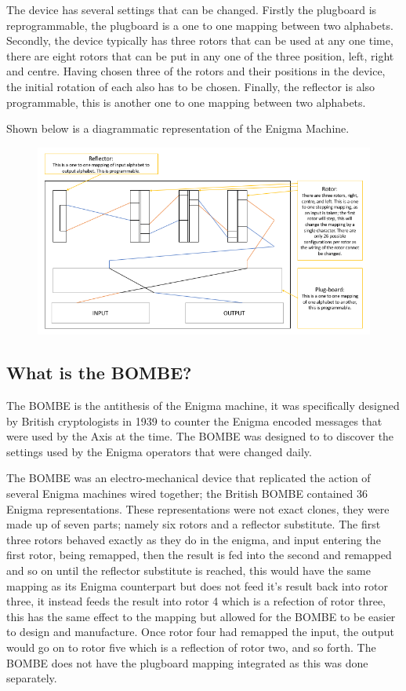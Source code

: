 \documentclass[12pt,a4paper]{article}
\begin{document}
The device has several settings that can be changed. Firstly the plugboard is reprogrammable, the plugboard is a one to one mapping between two alphabets. Secondly, the device typically has three rotors that can be used at any one time, there are eight rotors that can be put in any one of the three position, left, right and centre. Having chosen three of the rotors and their positions in the device, the initial rotation of each also has to be chosen. Finally, the reflector is also programmable, this is another one to one mapping between two alphabets.

Shown below is a diagrammatic representation of the Enigma Machine.

\begin{figure}[h]
\centering
\includegraphics[width=\textwidth]{enigmaDiagram.png}
\end{figure}

\subsection{What is the BOMBE?}

The BOMBE is the antithesis of the Enigma machine, it was specifically designed by British cryptologists in 1939 to counter the Enigma encoded messages that were used by the Axis at the time. The BOMBE was designed to to discover the settings used by the Enigma operators that were changed daily. 

The BOMBE was an electro-mechanical device that replicated the action of several Enigma machines wired together; the British BOMBE contained 36 Enigma representations. These representations were not exact clones, they were made up of seven parts; namely six rotors and a reflector substitute. The first three rotors behaved exactly as they do in the enigma, and input entering the first rotor, being remapped, then the result is fed into the second and remapped and so on until the reflector substitute is reached, this would have the same mapping as its Enigma counterpart but does not feed it's result back into rotor three, it instead feeds the result into rotor 4 which is a refection of rotor three, this has the same effect to the mapping but allowed for the BOMBE to be easier to design and manufacture. Once rotor four had remapped the input, the output would go on to rotor five which is a reflection of rotor two, and so forth. The BOMBE does not have the plugboard mapping integrated as this was done separately.
\end{document}
